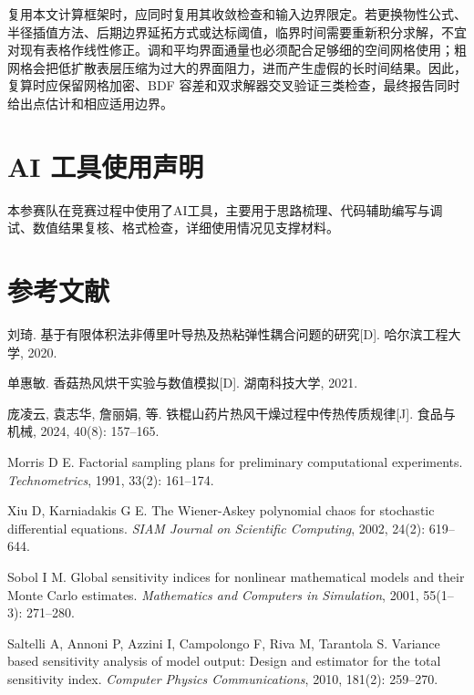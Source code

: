 \documentclass[UTF8,a4paper,12pt]{ctexart}
\numberwithin{equation}{section}
\begin{document}
复用本文计算框架时，应同时复用其收敛检查和输入边界限定。若更换物性公式、半径插值方法、后期边界延拓方式或达标阈值，临界时间需要重新积分求解，不宜对现有表格作线性修正。调和平均界面通量也必须配合足够细的空间网格使用；粗网格会把低扩散表层压缩为过大的界面阻力，进而产生虚假的长时间结果。因此，复算时应保留网格加密、BDF 容差和双求解器交叉验证三类检查，最终报告同时给出点估计和相应适用边界。

\section{AI 工具使用声明}
本参赛队在竞赛过程中使用了AI工具，主要用于思路梳理、代码辅助编写与调试、数值结果复核、格式检查，详细使用情况见支撑材料。

\section{参考文献}
\begin{enumerate}[label={[\arabic*]},leftmargin=3em,itemsep=0pt,topsep=0pt]
  \item 刘琦. 基于有限体积法非傅里叶导热及热粘弹性耦合问题的研究[D]. 哈尔滨工程大学, 2020.
  \item 单惠敏. 香菇热风烘干实验与数值模拟[D]. 湖南科技大学, 2021.
  \item 庞凌云, 袁志华, 詹丽娟, 等. 铁棍山药片热风干燥过程中传热传质规律[J]. 食品与机械, 2024, 40(8): 157--165.
  \item Morris D E. Factorial sampling plans for preliminary computational experiments. \textit{Technometrics}, 1991, 33(2): 161--174.
  \item Xiu D, Karniadakis G E. The Wiener-Askey polynomial chaos for stochastic differential equations. \textit{SIAM Journal on Scientific Computing}, 2002, 24(2): 619--644.
  \item Sobol I M. Global sensitivity indices for nonlinear mathematical models and their Monte Carlo estimates. \textit{Mathematics and Computers in Simulation}, 2001, 55(1--3): 271--280.
  \item Saltelli A, Annoni P, Azzini I, Campolongo F, Riva M, Tarantola S. Variance based sensitivity analysis of model output: Design and estimator for the total sensitivity index. \textit{Computer Physics Communications}, 2010, 181(2): 259--270.
\end{enumerate}
\end{document}
